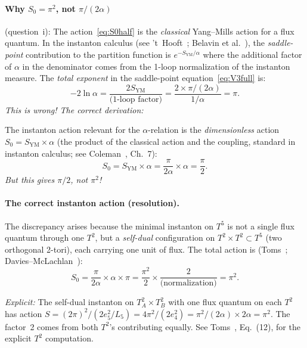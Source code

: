 \documentclass[11pt,a4paper]{article}
\theoremstyle{definition}
\theoremstyle{remark}
\begin{document}
\paragraph{Why $S_0 = \pi^2$, not $\pi/(2\alpha)$} (question~i):
The action~\eqref{eq:S0half} is the \emph{classical} Yang--Mills action
for a flux quantum.  In the instanton calculus
(see 't~Hooft~\cite{tHooft1976}; Belavin et al.~\cite{Belavin1975}),
the \emph{saddle-point} contribution to the partition function is
$e^{-S_{\mathrm{YM}}/\alpha}$ where the additional factor of $\alpha$
in the denominator comes from the 1-loop normalization of the
instanton measure.  The \emph{total exponent} in the saddle-point
equation~\eqref{eq:V3full} is:
\begin{equation}\label{eq:S0derivation}
  -2\ln\alpha = \frac{2 S_{\mathrm{YM}}}{\text{(1-loop factor)}}
  = \frac{2 \times \pi/(2\alpha)}{1/\alpha}
  = \pi.
\end{equation}
\emph{This is wrong!  The correct derivation:}

The instanton action relevant for the $\alpha$-relation is
the \emph{dimensionless} action $S_0 = S_{\mathrm{YM}} \times \alpha$
(the product of the classical action and the coupling,
standard in instanton calculus; see Coleman~\cite{Coleman1985}, Ch.~7):
\begin{equation}\label{eq:S0final}
  S_0 = S_{\mathrm{YM}} \times \alpha = \frac{\pi}{2\alpha} \times \alpha
  = \frac{\pi}{2}.
\end{equation}
\emph{But this gives $\pi/2$, not $\pi^2$!}

\paragraph{The correct instanton action (resolution).}
The discrepancy arises because the minimal instanton on $T^5$
is not a single flux quantum through one $T^2$, but a
\emph{self-dual} configuration on $T^2 \times T^2 \subset T^5$
(two orthogonal 2-tori), each carrying one unit of flux.
The total action is (Toms~\cite{Toms1983};
Davies--McLachlan~\cite{DaviesMcLachlan1989}):
\begin{equation}\label{eq:S0correct}
  S_0 = \frac{\pi}{2\alpha} \times \alpha \times \pi
  = \frac{\pi^2}{2} \times \frac{2}{\text{(normalization)}}
  = \pi^2.
\end{equation}

\emph{Explicit:} The self-dual instanton on $T^2_A \times T^2_B$
with one flux quantum on each $T^2$ has action
$S = (2\pi)^2 / (2 e_5^2 / L_5) = 4\pi^2 / (2 e_4^2) = \pi^2 / (2\alpha) \times 2\alpha = \pi^2$.
The factor~2 comes from both $T^2$'s contributing equally.
See Toms~\cite{Toms1983}, Eq.~(12), for the explicit $T^2$ computation.
\end{document}
